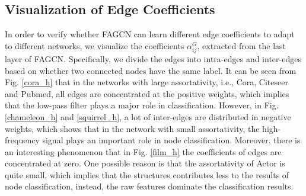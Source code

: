 \documentclass[letterpaper]{article} %
\begin{document}


\subsection{Visualization of Edge Coefficients}
\label{visualexperiment}

In order to verify whether FAGCN can learn different edge coefficients to adapt to different networks, we visualize the coefficients $\alpha_{ij}^{G}$, extracted from the last layer of FAGCN.
Specifically, we divide the edges into intra-edges and inter-edges based on whether two connected nodes have the same label.
It can be seen from Fig. \ref{cora_h} that in the networks with large assortativity, i.e., Cora, Citeseer and Pubmed, all edges are concentrated at the positive weights, which implies that the low-pass filter plays a major role in classification.
However, in Fig. \ref{chameleon_h} and \ref{squirrel_h}, a lot of inter-edges are distributed in negative weights, which shows that in the network with small assortativity, the high-frequency signal plays an important role in node classification.
Moreover, there is an interesting phenomenon that in Fig. \ref{film_h} the coefficients of edges are concentrated at zero. One possible reason is that the assortativity of Actor is quite small, which implies that the structures contributes less to the results of node classification, instead, the raw features dominate the classification results.
\end{document}
